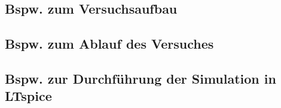 %
\subsection{Bspw. zum Versuchsaufbau}
%
\lipsum[2]
%
%
%
%
\begin{flushright}
  \textit{\autorA}
\end{flushright}
%
%
%
\subsection{Bspw. zum Ablauf des Versuches}
%
\lipsum[5]
%
%
%
%
\begin{flushright}
  \textit{\autorA}
\end{flushright}
%
%
%
\subsection{Bspw. zur Durchführung der Simulation in LTspice}
%
\lipsum[2]
%
%
%
%
\begin{flushright}
  \textit{\autorA}
\end{flushright}
%
%
%